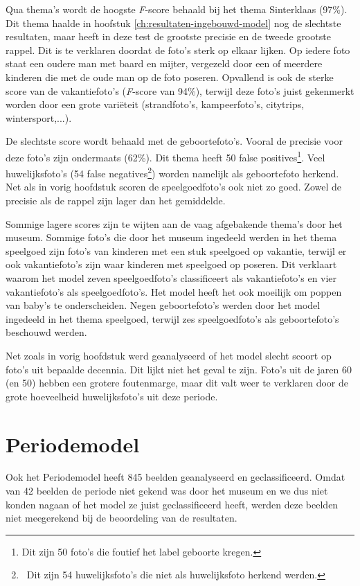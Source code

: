 Qua thema’s wordt de hoogste \textit{F}-score behaald bij het thema Sinterklaas (97\%). Dit thema haalde in hoofstuk \ref{ch:resultaten-ingebouwd-model} nog de slechtste resultaten, maar heeft in deze test de grootste precisie en de tweede grootste rappel. Dit is te verklaren doordat de foto’s sterk op elkaar lijken. Op iedere foto staat een oudere man met baard en mijter, vergezeld door een of meerdere kinderen die met de oude man op de foto poseren. Opvallend is ook de sterke score van de vakantiefoto’s (\textit{F}-score van 94\%), terwijl deze foto’s juist gekenmerkt worden door een grote variëteit (strandfoto’s, kampeerfoto’s, citytrips, wintersport,...).

De slechtste score wordt behaald met de geboortefoto’s. Vooral de precisie voor deze foto’s zijn ondermaats (62\%). Dit thema heeft 50 false positives\footnote{Dit zijn 50 foto's die foutief het label geboorte kregen.}. Veel huwelijksfoto’s (54 false negatives\footnote{~Dit zijn 54 huwelijksfoto's die niet als huwelijksfoto herkend werden.}) worden namelijk als geboortefoto herkend.  Net als in vorig hoofdstuk scoren de speelgoedfoto’s ook niet zo goed. Zowel de precisie als de rappel zijn lager dan het gemiddelde.

Sommige lagere scores zijn te wijten aan de vaag afgebakende thema’s door het museum. Sommige foto’s die door het museum ingedeeld werden in het thema speelgoed zijn  foto’s van kinderen met een stuk speelgoed op vakantie, terwijl er ook vakantiefoto’s zijn waar kinderen met speelgoed op poseren. Dit verklaart waarom het model zeven speelgoedfoto’s classificeert als vakantiefoto’s en vier vakantiefoto’s als speelgoedfoto’s. Het model heeft het ook moeilijk om poppen van baby’s te onderscheiden. Negen geboortefoto’s werden door het model ingedeeld in het thema speelgoed, terwijl zes speelgoedfoto’s als geboortefoto’s beschouwd werden.

Net zoals in vorig hoofdstuk werd geanalyseerd of het model slecht scoort op foto’s uit bepaalde decennia. Dit lijkt niet het geval te zijn. Foto’s uit de jaren 60 (en 50) hebben een grotere foutenmarge, maar dit valt weer te verklaren door de grote hoeveelheid huwelijksfoto’s uit deze periode.

\section{Periodemodel}
\label{sec:periodemodel}

Ook het Periodemodel heeft 845 beelden geanalyseerd en geclassificeerd. Omdat van 42 beelden de periode niet gekend was door het museum en we dus niet konden nagaan of het model ze juist geclassificeerd heeft, werden deze beelden niet meegerekend bij de beoordeling van de resultaten. 

